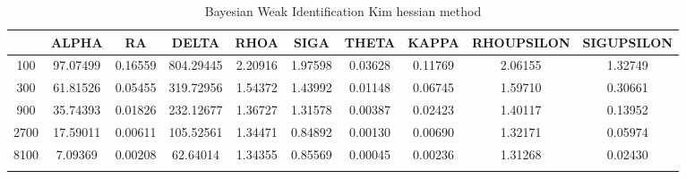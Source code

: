 \documentclass[a4paper,10pt]{article}
\begin{document}
\centering
\begin{longtable}{cccccccccc}
\toprule
 & ALPHA & RA & DELTA & RHOA & SIGA & THETA & KAPPA & RHOUPSILON & SIGUPSILON \\
\midrule
100 & 97.07499 & 0.16559 & 804.29445 & 2.20916 & 1.97598 & 0.03628 & 0.11769 & 2.06155 & 1.32749 \\
300 & 61.81526 & 0.05455 & 319.72956 & 1.54372 & 1.43992 & 0.01148 & 0.06745 & 1.59710 & 0.30661 \\
900 & 35.74393 & 0.01826 & 232.12677 & 1.36727 & 1.31578 & 0.00387 & 0.02423 & 1.40117 & 0.13952 \\
2700 & 17.59011 & 0.00611 & 105.52561 & 1.34471 & 0.84892 & 0.00130 & 0.00690 & 1.32171 & 0.05974 \\
8100 & 7.09369 & 0.00208 & 62.64014 & 1.34355 & 0.85569 & 0.00045 & 0.00236 & 1.31268 & 0.02430 \\
\bottomrule
\caption{Bayesian Weak Identification Kim hessian method}
\label{table:tbl:WeakKim_hessian}
\end{longtable}
\end{document}
